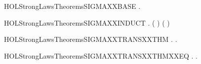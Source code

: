 \newcommand{\HOLStrongLawsTheoremsPREFXXISXXPREFIX}{\UseVerbatim{HOLStrongLawsTheoremsPREFXXISXXPREFIX}}
\begin{SaveVerbatim}{HOLStrongLawsTheoremsSIGMAXXBASE}
\HOLTokenTurnstile{} \HOLSymConst{\HOLTokenForall{}}.    \HOLSymConst{=}  
\end{SaveVerbatim}
\newcommand{\HOLStrongLawsTheoremsSIGMAXXBASE}{\UseVerbatim{HOLStrongLawsTheoremsSIGMAXXBASE}}
\begin{SaveVerbatim}{HOLStrongLawsTheoremsSIGMAXXINDUCT}
\HOLTokenTurnstile{} \HOLSymConst{\HOLTokenForall{}} .   ( ) \HOLSymConst{=}    \HOLSymConst{\ensuremath{+}}  ( )
\end{SaveVerbatim}
\newcommand{\HOLStrongLawsTheoremsSIGMAXXINDUCT}{\UseVerbatim{HOLStrongLawsTheoremsSIGMAXXINDUCT}}
\begin{SaveVerbatim}{HOLStrongLawsTheoremsSIGMAXXTRANSXXTHM}
\HOLTokenTurnstile{} \HOLSymConst{\HOLTokenForall{}}   .    \HOLTokenTransBegin{}\HOLTokenTransEnd {} \HOLSymConst{\HOLTokenImp{}} \HOLSymConst{\HOLTokenExists{}}.  \HOLSymConst{\HOLTokenLeq{}}  \HOLSymConst{\HOLTokenConj{}}   \HOLTokenTransBegin{}\HOLTokenTransEnd {}
\end{SaveVerbatim}
\newcommand{\HOLStrongLawsTheoremsSIGMAXXTRANSXXTHM}{\UseVerbatim{HOLStrongLawsTheoremsSIGMAXXTRANSXXTHM}}
\begin{SaveVerbatim}{HOLStrongLawsTheoremsSIGMAXXTRANSXXTHMXXEQ}
\HOLTokenTurnstile{} \HOLSymConst{\HOLTokenForall{}}   .    \HOLTokenTransBegin{}\HOLTokenTransEnd {} \HOLSymConst{\HOLTokenEquiv{}} \HOLSymConst{\HOLTokenExists{}}.  \HOLSymConst{\HOLTokenLeq{}}  \HOLSymConst{\HOLTokenConj{}}   \HOLTokenTransBegin{}\HOLTokenTransEnd {}
\end{SaveVerbatim}
\newcommand{\HOLStrongLawsTheoremsSIGMAXXTRANSXXTHMXXEQ}{\UseVerbatim{HOLStrongLawsTheoremsSIGMAXXTRANSXXTHMXXEQ}}
